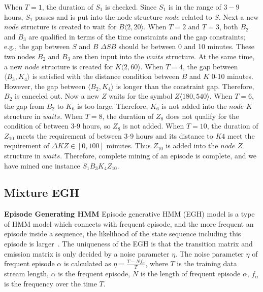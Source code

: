 When $T=1$, the duration of $S_1$ is checked. 
Since $S_1$ is in the range of $3-9$ hours, 
$S_1$ passes and is put into the node structure $node$ related to $S$. 
Next a new $node$ structure is created to wait for $B\langle 2, 20 \rangle $. 
When $T=2$ and $T=3$, both $B_2$ and $B_3$ 
are qualified in terms of the time constraints and 
the gap constraints; 
e.g., the gap between $S$ and $B$ $\Delta SB$ should 
be between 0 and 10 minutes. 
These two nodes $B_2$ and $B_3$ are then input into the 
$waits$ structure. 
At the same time, 
a new $node$ structure is created for $K\langle 2, 60 \rangle $. 
When $T=4$, the gap between $\langle B_3, K_4 \rangle$ 
is satisfied with the distance condition between 
$B$ and $K$ 0-10 minutes. 
However, the gap between $\langle B_2, K_4 \rangle$ 
is longer than the constraint gap. 
Therefore, $B_2$ is canceled out. 
Now a new $Z$ waits for the symbol $Z\langle 180, 540 \rangle$. 
When $T=6$, the gap from $B_2$ to $K_6$ is 
too large. Therefore, $K_6$ is not added into the $node$ $K$ structure in $waits$.
When $T=8$, the duration of $Z_8$ does not qualify for the condition of between 3-9 hours,  
so $Z_8$ is not added. 
When $T=10$, the duration of $Z_{10}$ meets the requirement of between 3-9 hours 
and its distance to $K4$ meet the requirement 
of $\Delta KZ \in [0,100]$ minutes. 
Thus $Z_{10}$ is added into the $node$ $Z$ structure in $waits$.
Therefore, complete mining of an episode is complete, and 
we have mined one instance $S_1B_3K_4Z_{10}$. 


\subsection{Mixture EGH}
\textbf{Episode Generating HMM}
Episode generative HMM (EGH) model is a 
type of HMM model which connects with frequent episode, 
and the more frequent an episode inside a sequence, 
the likelihood of the state sequence including this episode is larger~\cite{laxman2008stream}.  
The uniqueness of the EGH is that 
the transition matrix and 
emission matrix is only decided by a noise parameter $\eta$. 
The noise parameter $\eta$ of frequent episode $\alpha$ 
is calculated as $\eta=\frac{T-Nf_{\alpha}}{T}$,  
where $T$ is the training data stream length, 
$\alpha$ is the frequent episode, 
$N$ is the length of frequent episode $\alpha$, 
$f_{\alpha}$ is the frequency over the time $T$.


